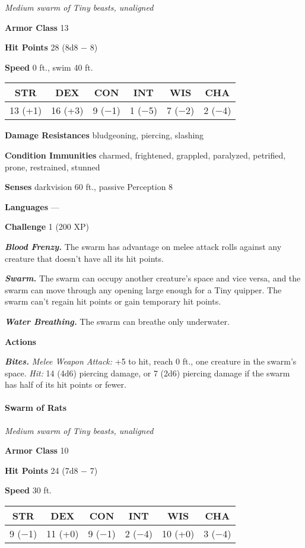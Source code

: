 \documentclass[
]{article}
\begin{document}
\emph{Medium swarm of Tiny beasts, unaligned}

\textbf{Armor Class} 13

\textbf{Hit Points} 28 (8d8 − 8)

\textbf{Speed} 0 ft., swim 40 ft.

\begin{longtable}[]{@{}cccccc@{}}
\toprule
STR & DEX & CON & INT & WIS & CHA\tabularnewline
\midrule
\endhead
13 (+1) & 16 (+3) & 9 (−1) & 1 (−5) & 7 (−2) & 2 (−4)\tabularnewline
\bottomrule
\end{longtable}

\textbf{Damage Resistances} bludgeoning, piercing, slashing

\textbf{Condition Immunities} charmed, frightened, grappled, paralyzed,
petrified, prone, restrained, stunned

\textbf{Senses} darkvision 60 ft., passive Perception 8

\textbf{Languages} ---

\textbf{Challenge} 1 (200 XP)

\emph{\textbf{Blood Frenzy.}} The swarm has advantage on melee attack
rolls against any creature that doesn't have all its hit points.

\emph{\textbf{Swarm.}} The swarm can occupy another creature's space and
vice versa, and the swarm can move through any opening large enough for
a Tiny quipper. The swarm can't regain hit points or gain temporary hit
points.

\emph{\textbf{Water Breathing.}} The swarm can breathe only underwater.

\textbf{Actions}

\emph{\textbf{Bites.}} \emph{Melee Weapon Attack:} +5 to hit, reach 0
ft., one creature in the swarm's space. \emph{Hit:} 14 (4d6) piercing
damage, or 7 (2d6) piercing damage if the swarm has half of its hit
points or fewer.

\hypertarget{swarm-of-rats}{%
\paragraph{Swarm of Rats}\label{swarm-of-rats}}

\emph{Medium swarm of Tiny beasts, unaligned}

\textbf{Armor Class} 10

\textbf{Hit Points} 24 (7d8 − 7)

\textbf{Speed} 30 ft.

\begin{longtable}[]{@{}cccccc@{}}
\toprule
STR & DEX & CON & INT & WIS & CHA\tabularnewline
\midrule
\endhead
9 (−1) & 11 (+0) & 9 (−1) & 2 (−4) & 10 (+0) & 3 (−4)\tabularnewline
\bottomrule
\end{longtable}
\end{document}
